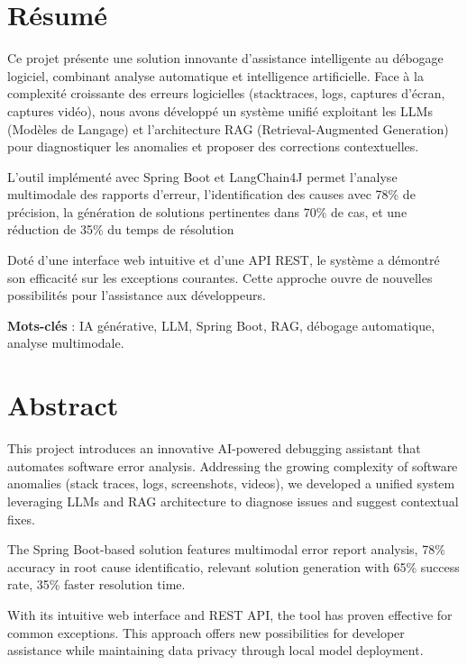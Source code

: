 \documentclass[12pt,a4paper]{report}
\begin{document}
	\thispagestyle{empty}
	
	\chapter*{Résumé}
	
	Ce projet présente une solution innovante d'assistance intelligente au débogage logiciel, combinant analyse automatique et intelligence artificielle. Face à la complexité croissante des erreurs logicielles (stacktraces, logs, captures d'écran, captures vidéo), nous avons développé un système unifié exploitant les LLMs (Modèles de Langage) et l'architecture RAG (Retrieval-Augmented Generation) pour diagnostiquer les anomalies et proposer des corrections contextuelles.
	
	L'outil implémenté avec Spring Boot et LangChain4J permet l'analyse multimodale des rapports d'erreur, l'identification des causes avec 78\% de précision, la génération de solutions pertinentes dans 70\% de cas, et une réduction de 35\% du temps de résolution
	
	Doté d'une interface web intuitive et d'une API REST, le système a démontré son efficacité sur les exceptions courantes. Cette approche ouvre de nouvelles possibilités pour l'assistance aux développeurs.
	
	\textbf{Mots-clés} : IA générative, LLM, Spring Boot, RAG, débogage automatique, analyse multimodale.
	\thispagestyle{empty}

	\chapter*{Abstract}
	
	This project introduces an innovative AI-powered debugging assistant that automates software error analysis. Addressing the growing complexity of software anomalies (stack traces, logs, screenshots, videos), we developed a unified system leveraging LLMs and RAG architecture to diagnose issues and suggest contextual fixes.
	
	The Spring Boot-based solution features multimodal error report analysis, 78\% accuracy in root cause identificatio, relevant solution generation with 65\% success rate, 35\% faster resolution time.
	
	With its intuitive web interface and REST API, the tool has proven effective for common exceptions. This approach offers new possibilities for developer assistance while maintaining data privacy through local model deployment.
	
\end{document}
